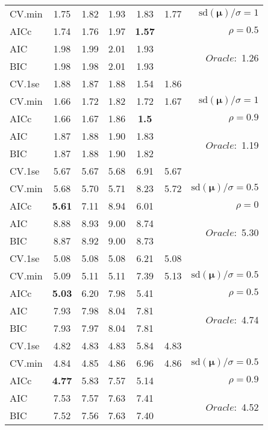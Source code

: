 \begin{table}
\begin{center}
\begin{tabular}{l*{5}{c}|r}
CV.min & 1.75 & 1.82 & 1.93 & 1.83 & 1.77 &  $\mathrm{sd}(\mathbf{\mu})/\sigma=1$ \\
AICc & 1.74 & 1.76 & 1.97 & {\bf 1.57} & & $\rho=0.5$ \\
AIC & 1.98 & 1.99 & 2.01 & 1.93 & &  \multirow{2}{*}{$Oracle: $ 1.26} \\
BIC & 1.98 & 1.98 & 2.01 & 1.93 & &  \\
 \hline 
CV.1se & 1.88 & 1.87 & 1.88 & 1.54 & 1.86 & \\
CV.min & 1.66 & 1.72 & 1.82 & 1.72 & 1.67 &  $\mathrm{sd}(\mathbf{\mu})/\sigma=1$ \\
AICc & 1.66 & 1.67 & 1.86 & {\bf 1.5} & & $\rho=0.9$ \\
AIC & 1.87 & 1.88 & 1.90 & 1.83 & &  \multirow{2}{*}{$Oracle: $ 1.19} \\
BIC & 1.87 & 1.88 & 1.90 & 1.82 & &  \\
 \hline 
CV.1se & 5.67 & 5.67 & 5.68 & 6.91 & 5.67 & \\
CV.min & 5.68 & 5.70 & 5.71 & 8.23 & 5.72 &  $\mathrm{sd}(\mathbf{\mu})/\sigma=0.5$ \\
AICc & {\bf 5.61} & 7.11 & 8.94 & 6.01 & & $\rho=0$ \\
AIC & 8.88 & 8.93 & 9.00 & 8.74 & &  \multirow{2}{*}{$Oracle: $ 5.30} \\
BIC & 8.87 & 8.92 & 9.00 & 8.73 & &  \\
 \hline 
CV.1se & 5.08 & 5.08 & 5.08 & 6.21 & 5.08 & \\
CV.min & 5.09 & 5.11 & 5.11 & 7.39 & 5.13 &  $\mathrm{sd}(\mathbf{\mu})/\sigma=0.5$ \\
AICc & {\bf 5.03} & 6.20 & 7.98 & 5.41 & & $\rho=0.5$ \\
AIC & 7.93 & 7.98 & 8.04 & 7.81 & &  \multirow{2}{*}{$Oracle: $ 4.74} \\
BIC & 7.93 & 7.97 & 8.04 & 7.81 & &  \\
 \hline 
CV.1se & 4.82 & 4.83 & 4.83 & 5.84 & 4.83 & \\
CV.min & 4.84 & 4.85 & 4.86 & 6.96 & 4.86 &  $\mathrm{sd}(\mathbf{\mu})/\sigma=0.5$ \\
AICc & {\bf 4.77} & 5.83 & 7.57 & 5.14 & & $\rho=0.9$ \\
AIC & 7.53 & 7.57 & 7.63 & 7.41 & &  \multirow{2}{*}{$Oracle: $ 4.52} \\
BIC & 7.52 & 7.56 & 7.63 & 7.40 & &  \\
 \hline 
\end{tabular}
\end{center}
\vspace{-1cm}
\end{table}




